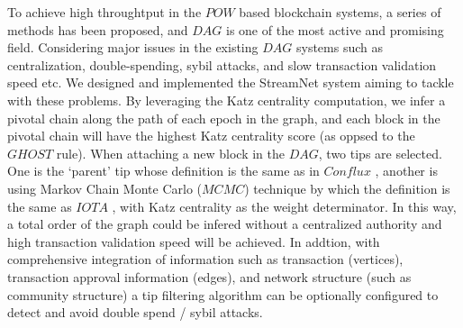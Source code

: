 To achieve high throughtput in the $POW$ based blockchain systems, a series of methods has been proposed, and $DAG$ is one of the most active and promising field.
Considering major issues in the existing $DAG$ systems such as centralization,
double-spending, sybil attacks, and slow transaction validation speed etc. 
We designed and implemented the StreamNet system aiming to tackle with these problems. 
By leveraging the Katz centrality computation, 
we infer a pivotal chain along the path of each epoch in the graph,
and each block in the pivotal chain will have the highest Katz centrality score (as oppsed to the $GHOST$ rule).
When attaching a new block in the $DAG$, two tips are selected. 
One is the `parent' tip whose definition is the same as in $Conflux$ \cite{li2018scaling},
another is using Markov Chain Monte Carlo ($MCMC$) technique by which the definition is the same as $IOTA$ \cite{popov2016tangle},
with Katz centrality as the weight determinator. 
In this way, a total order of the graph could be infered without a centralized authority and high transaction validation speed will be achieved.
In addtion, with comprehensive integration of information such as transaction (vertices), 
transaction approval information (edges), and network structure (such as community structure) 
a tip filtering algorithm can be optionally configured to detect and avoid double spend / sybil attacks.
